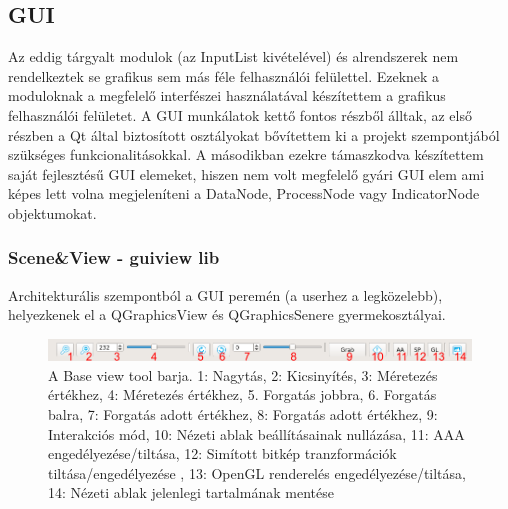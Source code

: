 \documentclass[a4paper,12pt,oneside]{report}
\begin{document}
\subsection{GUI}
Az eddig tárgyalt modulok (az InputList kivételével) és alrendszerek nem rendelkeztek se grafikus sem más féle felhasználói felülettel. Ezeknek a moduloknak a megfelelő interfészei használatával készítettem a grafikus felhasználói felületet. A GUI munkálatok kettő fontos részből álltak, az első részben a Qt által biztosított osztályokat bővítettem ki a projekt szempontjából szükséges funkcionalitásokkal. A másodikban ezekre támaszkodva készítettem saját fejlesztésű GUI elemeket, hiszen nem volt megfelelő gyári GUI elem ami képes lett volna megjeleníteni a DataNode, ProcessNode vagy IndicatorNode objektumokat.

\subsubsection{Scene\&View - guiview lib}
Architekturális szempontból a GUI peremén (a userhez a legközelebb), helyezkenek el a QGraphicsView és QGraphicsSenere gyermekosztályai.\\

\begin{center}
\begin{figure}[h]
  \includegraphics[width=1\textwidth]{toolbar.png}
  \caption{A Base view tool barja. 1: Nagytás, 2: Kicsinyítés, 3: Méretezés értékhez, 4: Méretezés értékhez, 5. Forgatás jobbra, 6. Forgatás balra, 7: Forgatás adott értékhez, 8: Forgatás adott értékhez, 9: Interakciós mód, 10: Nézeti ablak beállításainak nullázása, 11: AAA engedélyezése/tiltása, 12: Simított bitkép tranzformációk tiltása/engedélyezése , 13: OpenGL renderelés engedélyezése/tiltása, 14: Nézeti ablak jelenlegi tartalmának mentése }

  \label{fig:bimg_viewgui_toolbar}
\end{figure}
\end{center}
\end{document}
